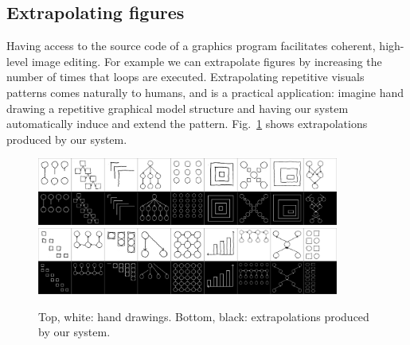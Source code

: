 \documentclass{article}
\newcommand{\remark}[1]{\textcolor{red}{[#1]}}
\theoremstyle{definition}
\begin{document}
\subsection{Extrapolating figures}
Having access to the source code of a graphics program facilitates coherent, high-level image editing.
For example we can extrapolate figures
by increasing the number of times that loops are executed.
Extrapolating repetitive visuals patterns comes naturally to humans,
and is a practical application:
imagine hand drawing a repetitive graphical model structure
and having our system automatically induce and extend the pattern.
Fig.~\ref{extrapolationFigure} shows extrapolations produced by our system.
\begin{figure}[H]\centering
  \includegraphics[width = 0.885\textwidth]{figures/extrapolationMatrix1.png}
  \includegraphics[width = 0.885\textwidth]{figures/extrapolationMatrix2.png}
   \caption{Top, white: hand drawings. Bottom, black: extrapolations produced by our system.}
  \label{extrapolationFigure}
  \end{figure}
%



\end{document}
